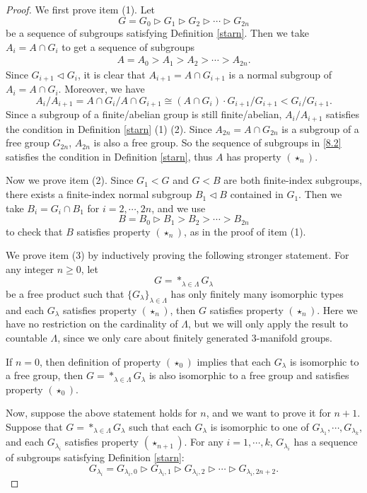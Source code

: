 \documentclass[10pt,a4paper]{amsart}
\begin{document}
\begin{proof}
We first prove item (1). Let 
$$G=G_0\vartriangleright G_1\vartriangleright G_2\vartriangleright \cdots \vartriangleright G_{2n}$$
be a sequence of subgroups satisfying Definition \ref{starn}. Then we take $A_i=A\cap G_i$ to get a sequence of subgroups
\begin{align}\label{8.2}
A=A_0>A_1>A_2>\cdots>A_{2n}.
\end{align}
Since $G_{i+1}\vartriangleleft  G_i$, it is clear that $A_{i+1}=A\cap G_{i+1}$ is a normal subgroup of $A_i=A\cap G_i$.
Moreover, we have
$$A_i/A_{i+1}=A\cap G_i/A\cap G_{i+1}\cong (A\cap G_i)\cdot G_{i+1}/G_{i+1}<G_i/G_{i+1}.$$
Since a subgroup of a finite/abelian group is still finite/abelian, $A_i/A_{i+1}$ satisfies the condition in Definition \ref{starn} (1) (2). Since $A_{2n}=A\cap G_{2n}$ is a subgroup of a free group $G_{2n}$, $A_{2n}$ is also a free group. So the sequence of subgroups in \eqref{8.2} satisfies the condition in Definition \ref{starn}, thus $A$ has property $(\star_n)$.

Now we prove item (2). Since $G_1<G$ and $G<B$ are both finite-index subgroups, there exists a finite-index normal subgroup $B_1\vartriangleleft B$ contained in $G_1$. Then we take $B_i=G_i\cap B_1$ for $i=2,\cdots,2n$, and we use 
$$B=B_0\vartriangleright B_1>B_2>\cdots>B_{2n}$$ 
to check that $B$ satisfies property $(\star_n)$, as in the proof of item (1). 

We prove item (3) by inductively proving the following stronger statement. For any integer $n\geq 0$, let $$G=*_{\lambda\in \Lambda}G_{\lambda}$$
be a free product such that $\{G_{\lambda}\}_{\lambda\in \Lambda}$ has only finitely many isomorphic types and each $G_{\lambda}$ satisfies property $(\star_n)$, then $G$ satisfies property $(\star_n)$. Here we have no restriction on the cardinality of $\Lambda$, but we will only apply the result to countable $\Lambda$, since we only care about finitely generated $3$-manifold groups.

If $n=0$, then definition of property $(\star_0)$ implies that each $G_{\lambda}$ is isomorphic to a free group, then $G=*_{\lambda\in \Lambda}G_{\lambda}$ is also isomorphic to a free group and satisfies property $(\star_0)$.

Now, suppose the above statement holds for $n$, and we want to prove it for $n+1$. Suppose that $G=*_{\lambda\in \Lambda}G_{\lambda}$ such that each $G_{\lambda}$ is isomorphic to one of $G_{\lambda_1},\cdots,G_{\lambda_k}$, and each $G_{\lambda_i}$ satisfies property $(\star_{n+1})$. For any $i=1,\cdots,k$, $G_{\lambda_i}$ has a sequence of subgroups satisfying Definition \ref{starn}:
$$G_{\lambda_i}=G_{\lambda_i,0}\vartriangleright G_{\lambda_i,1}\vartriangleright G_{\lambda_i,2}\vartriangleright \cdots \vartriangleright G_{\lambda_i,2n+2}.$$


\end{proof}
\end{document}
